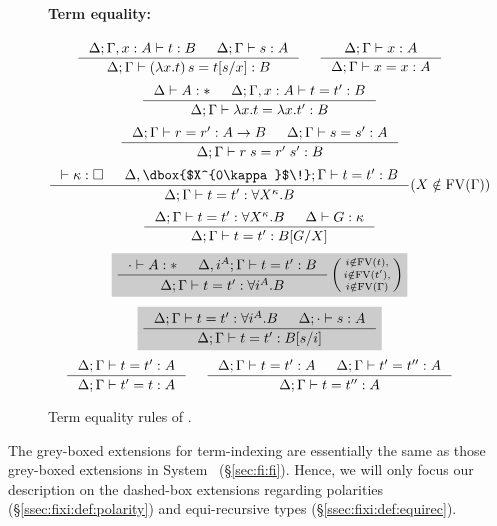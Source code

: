 \begin{figure}\begin{singlespace}\small
\paragraph{Term equality:} 
\[
   \inference{\Delta;\Gamma,x:A |- t:B & \Delta;\Gamma |- s:A}{
              \Delta;\Gamma |- (\lambda x.t)\,s=t[s/x] : B}
 ~~~~
   \inference{\Delta;\Gamma |- x:A}{\Delta;\Gamma |- x=x:A}
\]
\[ \inference{\Delta |- A:* & \Delta;\Gamma,x:A |- t=t':B}{
              \Delta;\Gamma |- \lambda x.t = \lambda x.t':B}
\]
\[
   \inference{\Delta;\Gamma |- r=r':A-> B & \Delta;\Gamma |- s=s':A}{
              \Delta;\Gamma |- r\;s=r'\;s':B}
\]
\[ \inference{ |- \kappa:\square
	     & \Delta, \dbox{$X^{0\kappa}$\!};\Gamma |- t=t' : B}{
              \Delta;\Gamma |- t=t' : \forall X^\kappa.B}
	     (X\notin\FV(\Gamma))
\]
\[
   \inference{ \Delta;\Gamma |- t=t' : \forall X^\kappa.B
             & \Delta |- G:\kappa }{
              \Delta;\Gamma |- t=t' : B[G/X]}
\]
\[ \newFi{
   \inference{\cdot |- A:* & \Delta, i^A;\Gamma |- t=t' : B}{
              \Delta;\Gamma |- t=t' : \forall i^A.B}
   \left(\begin{smallmatrix}
		i\notin\FV(t),\\
		i\notin\FV(t'),\\
		i\notin\FV(\Gamma)\end{smallmatrix}\right)
	}
\]
\[ \newFi{
   \inference{ \Delta;\Gamma |- t=t' : \forall i^A.B
             & \Delta;\cdot |- s:A}{
              \Delta;\Gamma |- t=t' : B[s/i]} }
\]
\[ \inference{\Delta;\Gamma |- t=t':A}{\Delta;\Gamma |- t'=t:A}
 ~~~~
   \inference{\Delta;\Gamma |- t=t':A & \Delta;\Gamma |- t'=t'':A}{
              \Delta;\Gamma |- t=t'':A}
\]
\end{singlespace}
\caption{Term equality rules of \Fixi.}
\label{fig:eqFixi2}
\end{figure}

The grey-boxed extensions for term-indexing are essentially the same as
those grey-boxed extensions in System \Fi\ (\S\ref{sec:fi:fi}). Hence, we will
only focus our description on the dashed-box extensions regarding polarities
(\S\ref{ssec:fixi:def:polarity}) and equi-recursive types
(\S\ref{ssec:fixi:def:equirec}).

